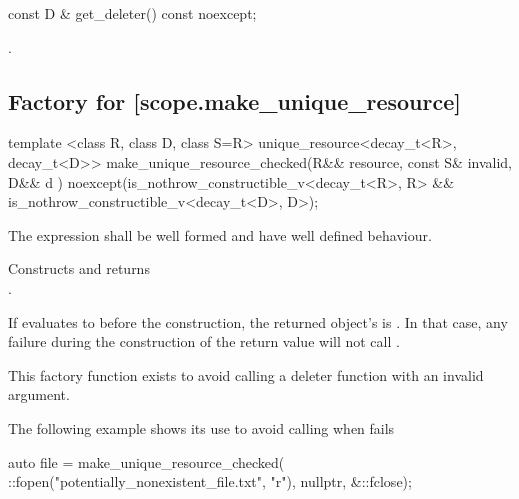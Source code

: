 \documentclass[ebook,11pt,article]{memoir}
\begin{document}
\begin{itemdecl}
const D & get_deleter() const noexcept;
\end{itemdecl}

\begin{itemdescr}
\pnum
\returns {}.
\end{itemdescr}

\newpage
\subsection {Factory for  [scope.make_unique_resource]}

\begin{itemdecl}
template <class R, class D, class S=R>
unique_resource<decay_t<R>, decay_t<D>>
make_unique_resource_checked(R&& resource, const S& invalid, D&& d ) 
noexcept(is_nothrow_constructible_v<decay_t<R>, R> &&
         is_nothrow_constructible_v<decay_t<D>, D>);
\end{itemdecl}

\begin{itemdescr}
\pnum
\requires The expression  shall be well formed and have well defined behaviour.

\pnum
\effects Constructs and returns \\
. 

\pnum
If  evaluates to  before the construction, the returned  object's  is . 
In that case, any failure during the construction of the return value will not call .

\pnum
\begin{note}
This factory function exists to avoid calling a deleter function with an invalid argument. 
\end{note}

\pnum
\begin{example}
The following example shows its use to avoid calling  when  fails
\begin{codeblock}
auto file = make_unique_resource_checked(
  ::fopen("potentially_nonexistent_file.txt", "r"), 
  nullptr, &::fclose);
\end{codeblock}
\end{example}

\end{itemdescr}
\end{document}
